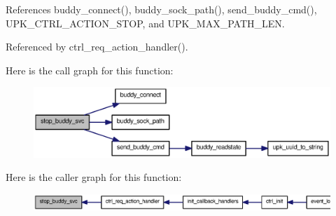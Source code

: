 References buddy\_\-connect(), buddy\_\-sock\_\-path(), send\_\-buddy\_\-cmd(), UPK\_\-CTRL\_\-ACTION\_\-STOP, and UPK\_\-MAX\_\-PATH\_\-LEN.



Referenced by ctrl\_\-req\_\-action\_\-handler().



Here is the call graph for this function:
\nopagebreak
\begin{figure}[H]
\begin{center}
\leavevmode
\includegraphics[width=386pt]{ctrl__buddy_8c_af36be3e8ca1253b0d412f404dcde2629_cgraph}
\end{center}
\end{figure}




Here is the caller graph for this function:
\nopagebreak
\begin{figure}[H]
\begin{center}
\leavevmode
\includegraphics[width=400pt]{ctrl__buddy_8c_af36be3e8ca1253b0d412f404dcde2629_icgraph}
\end{center}
\end{figure}


